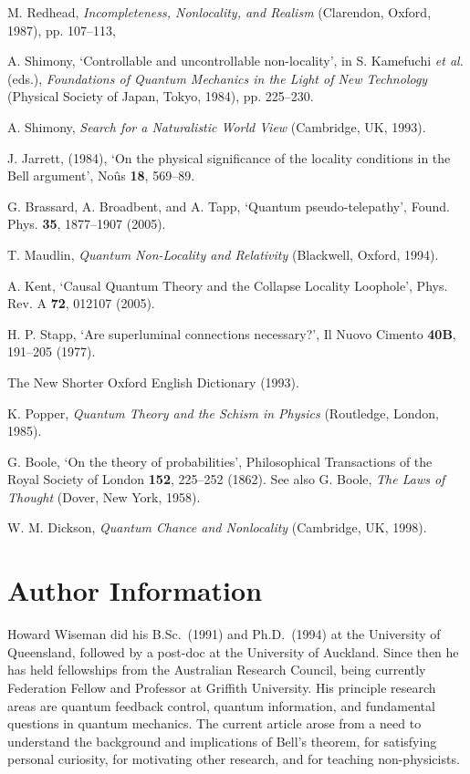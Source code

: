 \documentclass[12pt]{iopart}
\begin{document}
\begin{thebibliography}{10}
M. Redhead, {\em Incompleteness, Nonlocality, and Realism} (Clarendon, Oxford, 1987), pp. 107--113,

A. Shimony, `Controllable and uncontrollable non-locality', in S.
Kamefuchi {\em et al.} (eds.), {\em Foundations of Quantum Mechanics
in the Light of New Technology} (Physical Society of Japan, Tokyo,
1984), pp. 225--230.

A. Shimony, {\em Search for a Naturalistic World View} 
(Cambridge, UK, 1993).  

J. Jarrett, (1984), `On the physical significance of the locality conditions in the Bell argument', No\^us {\bf 18}, 569--89.

   G. Brassard, A. Broadbent, and A. Tapp, `Quantum pseudo-telepathy', Found. Phys. {\bf 35}, 1877--1907 (2005). %

T. Maudlin, {\em Quantum Non-Locality and Relativity} (Blackwell,
Oxford, 1994).

A. Kent,
`Causal Quantum Theory and the Collapse Locality Loophole',
Phys. Rev. A {\bf 72}, 012107 (2005).

H. P. Stapp, `Are superluminal connections necessary?', Il Nuovo
Cimento {\bf 40B}, 191--205 (1977).


The New Shorter Oxford English Dictionary (1993).

K. Popper,
{\em Quantum Theory and the Schism in Physics}
(Routledge, London, 1985). 

G. Boole, `On the theory of probabilities', Philosophical
Transactions of the Royal Society of London {\bf 152}, 225--252
(1862). See also G. Boole, {\em The Laws of Thought} (Dover, New
York, 1958).

W. M. Dickson, {\em Quantum Chance and Nonlocality}
(Cambridge, UK, 1998).


\end{thebibliography}

\section*{Author Information}

Howard Wiseman did his B.Sc.~(1991) and Ph.D.~(1994) at the University of Queensland, 
followed by a post-doc at the University of Auckland. Since then he has held 
fellowships from the Australian Research Council, being currently Federation Fellow 
and Professor at Griffith University. His principle research areas are quantum feedback control, quantum information, and fundamental questions in quantum mechanics.
The current article arose from a need to understand the background and implications
of Bell's theorem, for satisfying personal curiosity, for motivating other research, and for teaching  
non-physicists.
\end{document}
